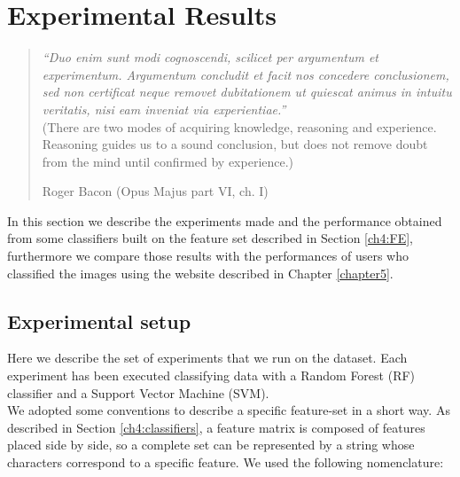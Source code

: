 \chapter{Experimental Results}
\label{chapter6}
\thispagestyle{empty}

\begin{quotation}
{\footnotesize
\noindent \emph{\textquotedblleft  Duo enim sunt modi cognoscendi, scilicet per argumentum et experimentum. Argumentum concludit et facit nos
concedere conclusionem, sed non certificat neque removet dubitationem ut quiescat animus in intuitu veritatis, nisi eam inveniat via experientiae.\textquotedblright}\\
\noindent (There are two modes of acquiring knowledge, reasoning and experience. Reasoning guides us to a sound conclusion, but does not remove doubt from the mind until
confirmed by experience.)
\begin{flushright}
Roger Bacon (Opus Majus part VI, ch. I)
\end{flushright}
}
\end{quotation}
\vspace{2cm}


In this section we describe the experiments made and the performance obtained from some classifiers built on the feature set described in Section \ref{ch4:FE},
furthermore we compare those results with the performances of users who classified the images using the website described in Chapter \ref{chapter5}.

\vspace{0.5cm}

\section{Experimental setup}

Here we describe the set of experiments that we run on the dataset. Each experiment has been executed classifying data with a Random Forest (\Gls{RF}) classifier and
a Support Vector Machine (\Gls{SVM}).\\
We adopted some conventions to describe a specific feature-set in a short way. As described in Section \ref{ch4:classifiers}, a feature matrix is composed of 
features placed side by side, so a complete set can be represented by a string whose characters correspond to a specific feature. We used the following nomenclature:

